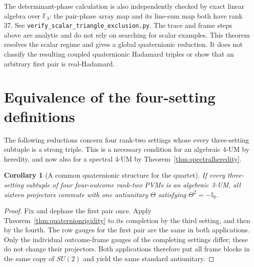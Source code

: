 \documentclass[11pt]{article}
\newtheorem{corollary}[theorem]{Corollary}
\newcommand{\id}{\mathbb I}
\begin{document}
The determinant-phase calculation is also independently checked by exact
linear algebra over $\mathbb F_3$: the pair-phase array map and its line-sum
map both have rank 37. See
\texttt{verify\_scalar\_triangle\_exclusion.py}. The trace and frame steps
above are analytic and do not rely on searching for scalar examples.
This theorem resolves the scalar regime and gives a global quaternionic
reduction. It does not classify the resulting coupled quaternionic
Hadamard triples or show that an arbitrary first pair is real-Hadamard.

\section{Equivalence of the four-setting definitions}
The following reductions concern four rank-two settings whose every
three-setting subtuple is a strong triple. This is a necessary condition
for an algebraic 4-UM by heredity, and now also for a spectral 4-UM by
Theorem~\ref{thm:spectralheredity}.

\begin{corollary}[A common quaternionic structure for the quartet]
\label{cor:quartetquaternion}
If every three-setting subtuple of four four-outcome rank-two PVMs is an
algebraic 3-UM, all sixteen projectors commute with one antiunitary
$\Theta$ satisfying $\Theta^2=-\id_8$.
\end{corollary}
\begin{proof}
Fix and dephase the first pair once. Apply
Theorem~\ref{thm:quaternionrigidity} to its completion by the third
setting, and then by the fourth. The row gauges for the first pair
are the same in both applications. Only the individual outcome-frame
gauges of the completing settings differ; these do not change their
projectors. Both applications therefore put all frame blocks in the
same copy of $SU(2)$ and yield the same standard antiunitary.
\end{proof}
\end{document}
